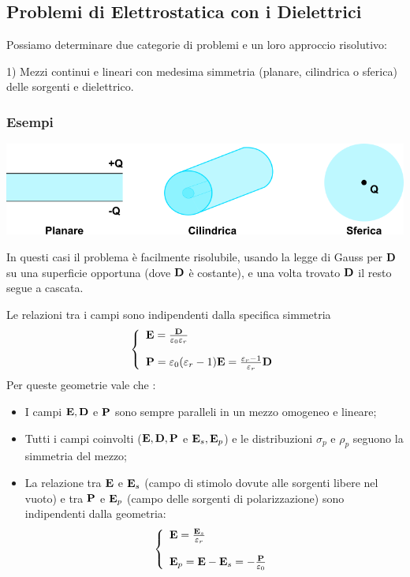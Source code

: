 \subsection{Problemi di Elettrostatica con i Dielettrici}

Possiamo determinare due categorie di problemi e un loro approccio risolutivo:
\newline

	1) Mezzi continui e lineari con medesima simmetria (planare, cilindrica o sferica) delle sorgenti e dielettrico.

\subsubsection{Esempi}

\begin{center}
	\includegraphics[width = 15cm]{images/configuration}
\end{center}	
In questi casi il problema \`e facilmente risolubile, usando la legge di Gauss per $\bold{D}$ su una superficie opportuna (dove $\bold{D}$  \`e costante), e una volta trovato $\bold{D}$ il resto segue a cascata.

Le relazioni tra i campi sono indipendenti dalla specifica simmetria 
\begin{equation*}
	\left \{ \begin{array}{l}
		\bold{E} = \frac{\bold{D} }{\varepsilon_0 \varepsilon_r} \\ \rule{0pt}{20pt}
		\bold{P} = \varepsilon_0(\varepsilon_{r} -1) \bold{E} = \frac{\varepsilon_{r} -1 }{\varepsilon_r} \bold{D}
	\end{array}\right.
\end{equation*}
Per queste geometrie vale che :
\begin{itemize}
	\item I campi $\bold{E}, \bold{D}$ e $\bold{P}$ sono sempre paralleli in un mezzo omogeneo e lineare;
	\item Tutti i campi coinvolti ($\bold{E}, \bold{D}, \bold{P}$ e $\bold{E}_s,\bold{E}_p$) e le distribuzioni $\sigma_{p}$ e $\rho_{p}$ seguono la simmetria del mezzo;
	\item La relazione tra $\bold{E}$ e $\bold{E}_{s}$ (campo di stimolo dovute alle sorgenti libere nel vuoto) e tra $\bold{P}$ e $\bold{E}_{p}$ (campo delle sorgenti di polarizzazione) sono indipendenti dalla geometria:
	\begin{align*}
	\left \{ \begin{array}{l}
		\bold{E} = \frac{\bold{E}_{s}}{\varepsilon_r} \\ \rule{0pt}{20pt}
		 \bold{E}_p = \bold{E} - \bold{E}_s = - \frac{\bold{P}}{\varepsilon_0}
	\end{array}\right.
	\end{align*}
\end{itemize}

